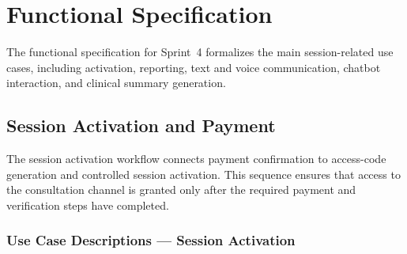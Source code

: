 \documentclass[a4paper,12pt]{report}
\begin{document}
\section{Functional Specification}
The functional specification for Sprint~4 formalizes the main session-related use cases, including activation, reporting, text and voice communication, chatbot interaction, and clinical summary generation.

\subsection{Session Activation and Payment}
The session activation workflow connects payment confirmation to access-code generation and controlled session activation. This sequence ensures that access to the consultation channel is granted only after the required payment and verification steps have completed.
\subsubsection*{Use Case Descriptions --- Session Activation}
\end{document}
